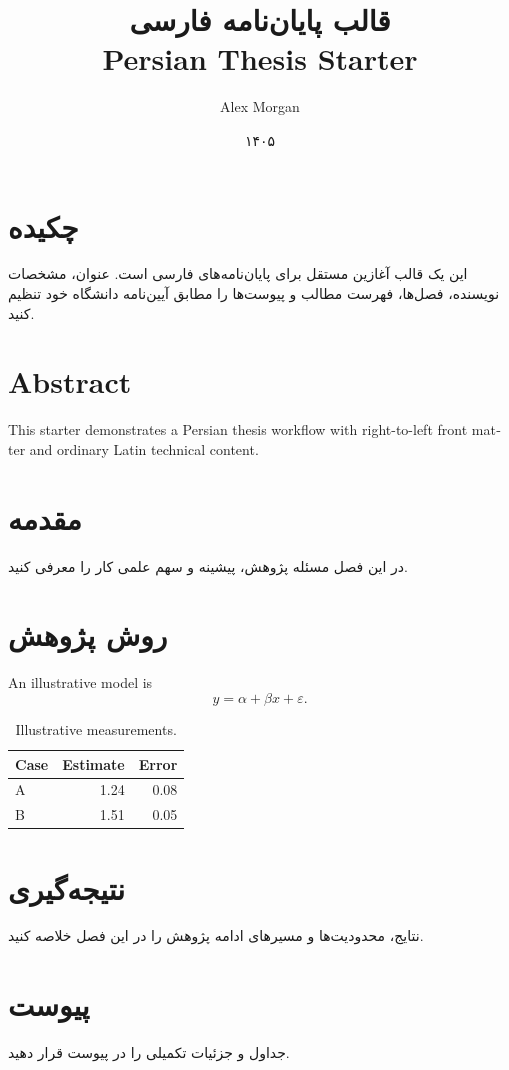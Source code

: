 \documentclass[12pt,a4paper,oneside]{book}
\title{قالب پایان‌نامه فارسی\\Persian Thesis Starter}
\author{Alex Morgan}
\date{۱۴۰۵}
\begin{document}
\frontmatter
\maketitle
\chapter*{چکیده}
این یک قالب آغازین مستقل برای پایان‌نامه‌های فارسی است. عنوان، مشخصات نویسنده،
فصل‌ها، فهرست مطالب و پیوست‌ها را مطابق آیین‌نامه دانشگاه خود تنظیم کنید.
\chapter*{Abstract}
\begin{english}
This starter demonstrates a Persian thesis workflow with right-to-left front
matter and ordinary Latin technical content.
\end{english}
\tableofcontents
\mainmatter
\chapter{مقدمه}
در این فصل مسئله پژوهش، پیشینه و سهم علمی کار را معرفی کنید.
\chapter{روش پژوهش}
\begin{english}
An illustrative model is
\begin{equation}
  y = \alpha + \beta x + \varepsilon.
\end{equation}
\begin{table}[ht]
  \centering
  \caption{Illustrative measurements.}
  \begin{tabular}{@{}lrr@{}}
    \toprule Case & Estimate & Error \\
    \midrule A & 1.24 & 0.08 \\
    B & 1.51 & 0.05 \\
    \bottomrule
  \end{tabular}
\end{table}
\end{english}
\chapter{نتیجه‌گیری}
نتایج، محدودیت‌ها و مسیرهای ادامه پژوهش را در این فصل خلاصه کنید.
\appendix
\chapter{پیوست}
جداول و جزئیات تکمیلی را در پیوست قرار دهید.
\end{document}
